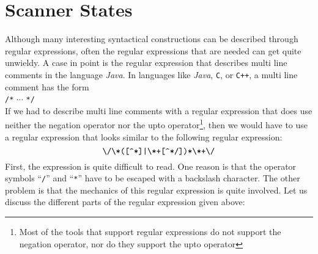 \section{Scanner States}
Although many interesting syntactical constructions can be described through regular expressions, often
the regular expressions that are needed can get quite unwieldy.  A case in point is the regular
expression that describes multi line comments in the language \textsl{Java}.  In languages like
\textsl{Java}, \texttt{C}, or \texttt{C++}, a multi line comment has the form
\\[0.2cm]
\hspace*{1.3cm}
\texttt{/*} $\cdots$ \texttt{*/}
\\[0.2cm]
If we had to describe multi line comments with a regular expression that does use neither the
negation operator nor the upto operator\footnote{Most of the tools that support regular expressions
  do not support the negation operator, nor do they support the upto operator}, 
then we would have to use a regular expression that looks similar to the following regular expression:
\begin{equation}
  \label{eq:multiline-comment}
\texttt{\symbol{92}/\symbol{92}*([\symbol{94}*]|\symbol{92}*+[\symbol{94}*/])*\symbol{92}*+\symbol{92}/}  
\end{equation}
First, the expression is quite difficult to read.  One reason is that the operator symbols
``\texttt{/}'' and ``\texttt{*}'' have to be escaped with a backslash character.  The other problem
is that the mechanics of this regular expression is quite involved.  Let us discuss the different
parts of the regular expression given above:

